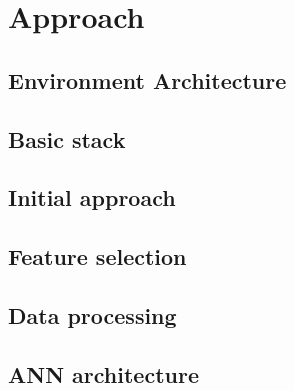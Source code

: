 
\chapter{Approach}

\label{approach}


\section{Environment Architecture}


\section{Basic stack}


\section{Initial approach}


\section{Feature selection}


\section{Data processing}


\section{ANN architecture}


